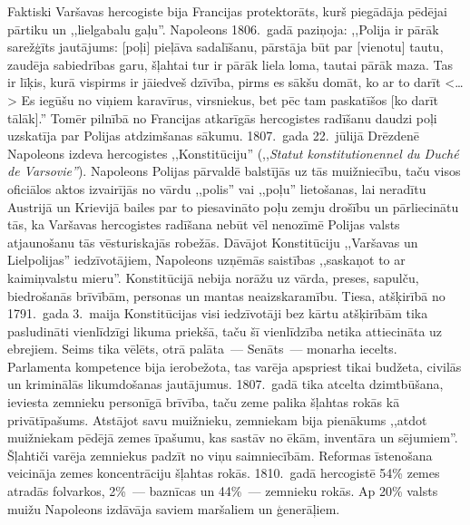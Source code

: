 \documentclass[twoside,a5paper,12pt,fleqn,openany]{extbook}
\newcommand{\frtxti}[1]{\textit{\textfrench{#1}}}
\newcommand{\citespace}{<\dots{}>}
\begin{document}
Faktiski Varšavas hercogiste bija Francijas protektorāts, kurš piegādāja pēdējai pārtiku un ,,lielgabalu gaļu''. Napoleons 1806.~gadā paziņoja: ,,Polija ir pārāk sarežģīts jautājums: [poļi] pieļāva sadalīšanu, pārstāja būt par [vienotu] tautu, zaudēja sabiedrības garu, šļahtai tur ir pārāk liela loma, tautai pārāk maza. Tas ir līķis, kurā vispirms ir jāiedveš dzīvība, pirms es sākšu domāt, ko ar to darīt \citespace{} Es iegūšu no viņiem karavīrus, virsniekus, bet pēc tam paskatīšos [ko darīt tālāk].'' Tomēr pilnībā no Francijas atkarīgās hercogistes radīšanu daudzi poļi uzskatīja par Polijas atdzimšanas sākumu. 1807.~gada 22.~jūlijā Drēzdenē Napoleons izdeva hercogistes ,,Konstitūciju'' (,,\frtxti{Statut konstitutionennel du Duché de Varsovie''}). Napoleons Polijas pārvaldē balstījās uz tās muižniecību, taču visos oficiālos aktos izvairījās no vārdu ,,polis'' vai ,,poļu'' lietošanas, lai neradītu Austrijā un Krievijā bailes par to piesavināto poļu zemju drošību un pārliecinātu tās, ka Varšavas hercogistes radīšana nebūt vēl nenozīmē Polijas valsts atjaunošanu tās vēsturiskajās robežās. Dāvājot Konstitūciju ,,Varšavas un Lielpolijas'' iedzīvotājiem, Napoleons uzņēmās saistības ,,saskaņot to ar kaimiņvalstu mieru''. Konstitūcijā nebija norāžu uz vārda, preses, sapulču, biedrošanās brīvībām, personas un mantas neaizskaramību. Tiesa, atšķirībā no 1791.~gada 3.~maija Konstitūcijas visi iedzīvotāji bez kārtu atšķirībām tika pasludināti vienlīdzīgi likuma priekšā, taču šī vienlīdzība netika attiecināta uz ebrejiem. Seims tika vēlēts, otrā palāta~--- Senāts~--- monarha iecelts. Parlamenta kompetence bija ierobežota, tas varēja apspriest tikai budžeta, civilās un kriminālās likumdošanas jautājumus. 1807.~gadā tika atcelta dzimtbūšana, ieviesta zemnieku personīgā brīvība, taču zeme palika šļahtas rokās kā privātīpašums. Atstājot savu muižnieku, zemniekam bija pienākums ,,atdot muižniekam pēdējā zemes īpašumu, kas sastāv no ēkām, inventāra un sējumiem''. Šļahtiči varēja zemniekus padzīt no viņu saimniecībām. Reformas īstenošana veicināja zemes koncentrāciju šļahtas rokās. 1810.~gadā hercogistē 54\% zemes atradās folvarkos, 2\%~--- baznīcas un 44\%~--- zemnieku rokās. Ap 20\% valsts muižu Napoleons izdāvāja saviem maršaliem un ģenerāļiem.
\end{document}

